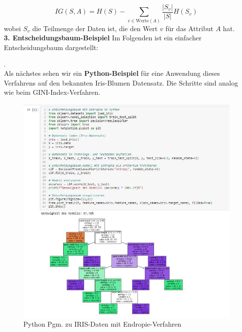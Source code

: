 \documentclass[12pt]{article}
\begin{document}
\[
IG(S, A) = H(S) - \sum_{v \in \text{Werte}(A)} \frac{|S_v|}{|S|} H(S_v)
\]
%
wobei \( S_v \) die Teilmenge der Daten ist, die den Wert \( v \) für das Attribut \( A \) hat.\\
%
\textbf{3. Entscheidungsbaum-Beispiel}
%
Im Folgenden ist ein einfacher Entscheidungsbaum dargestellt:

\begin{center}
\end{center}
%
.\\[0.5cm]
%
Als nächstes sehen wir ein \textbf{Python-Beispiel} für eine Anwendung dieses Verfahrens auf den bekannten Iris-Blumen Datensatz. Die Schritte sind analog wie beim GINI-Index-Verfahren.\\
%
\begin{figure}[htp]
  \centering
  \hspace*{-0.9cm} 
  \includegraphics[width=1.22\textwidth]{Python-Bsp-Dec-Endropie}
  \caption{Python Pgm. zu IRIS-Daten mit Endropie-Verfahren}     
  \label{fig:Pyt-Bsp-Endropie}
\end{figure}
\\[20.5cm]
%
\end{document}
